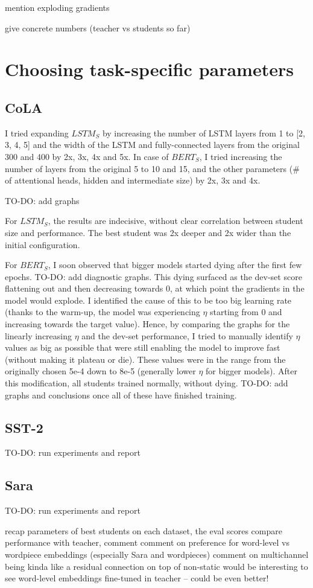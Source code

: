 \documentclass[bsc,frontabs,twoside,singlespacing,parskip,deptreport]{infthesis}
\begin{document}
{{{{        mention exploding gradients

        give concrete numbers (teacher vs students so far)

      }
    }
  }

  \section{Choosing task-specific parameters}{


    \subsection{CoLA}{
      I tried expanding $LSTM_S$ by increasing the number of LSTM layers from 1 to [2, 3, 4, 5] and the width of the LSTM and fully-connected layers from the original 300 and 400 by 2x, 3x, 4x and 5x.
      In case of $BERT_S$, I tried increasing the number of layers from the original 5 to 10 and 15, and the other parameters (\# of attentional heads, hidden and intermediate size) by 2x, 3x and 4x.
      
      TO-DO: add graphs

      For $LSTM_S$, the results are indecisive, without clear correlation between student size and performance. The best student was 2x deeper and 2x wider than the initial configuration.

      For $BERT_S$, I soon observed that bigger models started dying after the first few epochs. TO-DO: add diagnostic graphs. This dying surfaced as the dev-set score flattening out and then decreasing towards 0, at which point the gradients in the model would explode. I identified the cause of this to be too big learning rate (thanks to the warm-up, the model was experiencing $\eta$ starting from 0 and increasing towards the target value). Hence, by comparing the graphs for the linearly increasing $\eta$ and the dev-set performance, I tried to manually identify $\eta$ values as big as possible that were still enabling the model to improve fast (without making it plateau or die). These values were in the range from the originally chosen 5e-4 down to 8e-5 (generally lower $\eta$ for bigger models). After this modification, all students trained normally, without dying. TO-DO: add graphs and conclusions once all of these have finished training.
    }
    \subsection{SST-2}{
      TO-DO: run experiments and report
    }
    \subsection{Sara}{
      TO-DO: run experiments and report
    }
  }
  recap parameters of best students on each dataset, the eval scores
  compare performance with teacher, comment
  comment on preference for word-level vs wordpiece embeddings (especially Sara and wordpieces)
  comment on multichannel being kinda like a residual connection on top of non-static
  would be interesting to see word-level embeddings fine-tuned in teacher -- could be even better!
}
\end{document}
